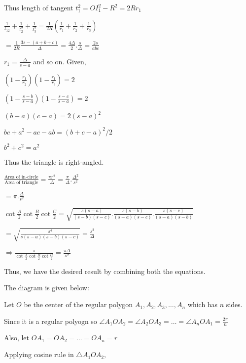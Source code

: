   Thus length of tangent $t_1^2 = OI_1^2 - R^2 = 2Rr_1$

  $\frac{1}{t_12} + \frac{1}{t_2^2} + \frac{1}{t_3^2} = \frac{1}{2R}\left(\frac{1}{r_1} + \frac{1}{r_2} +
  \frac{1}{r_3}\right)$

  $= \frac{1}{2R}\frac{3s - (a + b + c)}{\Delta} = \frac{4\Delta}{2}.\frac{s}{\Delta} = \frac{2s}{abc}$

\item $r_1 = \frac{\Delta}{s - a}$ and so on. Given,

  $\left(1 - \frac{r_1}{r_2}\right)\left(1 - \frac{r_1}{r_3}\right) = 2$

  $\left(1 - \frac{s - b}{s - a}\right)\left(1 - \frac{s - c}{s - a}\right) = 2$

  $(b - a)(c - a) = 2(s - a)^2$

  $bc + a^2 - ac - ab = (b + c - a)^2/2$

  $b^2 + c^2 = a^2$

  Thus the triangle is right-angled.

\item $\frac{\text{Area of in-circle}}{\text{Area of triangle}} = \frac{\pi r^2}{\Delta} = \frac{\pi}{\Delta}.\frac{\Delta^2}{s^2}$

  $= \pi .\frac{\Delta}{s^2}$

  $\cot\frac{A}{2}\cot\frac{B}{2}\cot\frac{C}{2} = \sqrt{\frac{s(s - a)}{(s - b)(s - c)}.\frac{s(s - b)}{(s - a)(s - c)}.\frac{s(s - c)}{(s - a)(s - b)}}$

  $= \sqrt{\frac{s^4}{s(s - a)(s - b)(s - c)}} = \frac{s^2}{\Delta}$

  $\Rightarrow \frac{\pi}{\cot\frac{A}{2}\cot\frac{B}{2}\cot\frac{C}{2}} = \frac{\pi\Delta}{s^2}$

  Thus, we have the desired result by combining both the equations.

\item The diagram is given below:

  \startplacefigure
    \externalfigure[21_13.pdf]
  \stopplacefigure

  Let $O$ be the center of the regular polygon $A_1, A_2, A_3, \ldots, A_n$ which has $n$ sides.

  Since it is a regular polyogn so $\angle A_1OA_2 = \angle A_2OA_3 = \ldots = \angle A_nOA_1 = \frac{2\pi}{n}$

  Also, let $OA_1 = OA_2 = \ldots = OA_n = r$

  Applying cosine rule in $\triangle A_1OA_2,$

